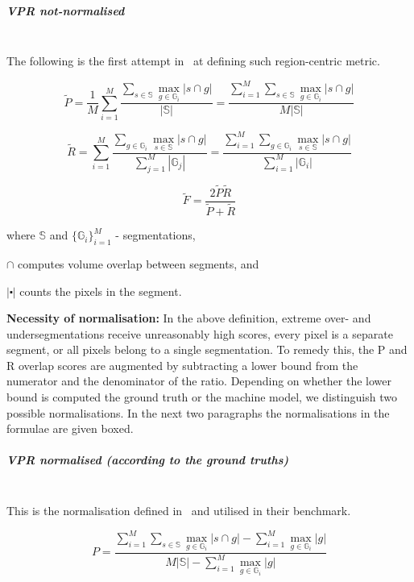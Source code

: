 \subparagraph*{VPR not-normalised}\mbox{}\\
The following is the first attempt in~\cite{Galasso13} at defining such region-centric metric.

\[
\tilde{P}=\frac{1}{M}\sum\limits _{i=1}^{M}\frac{\sum\limits _{s\in\mathbb{S}}\max\limits _{g\in\mathbb{G}_{i}}\left|s\cap g\right|}{\left|\mathbb{S}\right|}=\frac{\sum\limits _{i=1}^{M}\sum\limits _{s\in\mathbb{S}}\max\limits _{g\in\mathbb{G}_{i}}\left|s\cap g\right|}{M\left|\mathbb{S}\right|}
\]

\[
\tilde{R}=\sum\limits _{i=1}^{M}\frac{\sum\limits _{g\in\mathbb{G}_{i}}\max\limits _{s\in\mathbb{S}}\left|s\cap g\right|}{\sum\limits _{j=1}^{M}\left|\mathbb{G}_{j}\right|}=\frac{\sum\limits _{i=1}^{M}\sum\limits _{g\in\mathbb{G}_{i}}\max\limits _{s\in\mathbb{S}}\left|s\cap g\right|}{\sum\limits _{i=1}^{M}\left|\mathbb{G}_{i}\right|}
\]


\[
\tilde{F}=\frac{2\tilde{P}\tilde{R}}{\tilde{P}+\tilde{R}}
\]

where $\mathbb{S}$ and $\{\mathbb{G}_{i}\}_{i=1}^{M}$ - segmentations,

$\cap$ computes volume overlap between segments, and 

$\left|\centerdot\right|$ counts the pixels in the segment.%

\textbf{Necessity of normalisation:} In the above definition, extreme over- and undersegmentations receive unreasonably high scores, \ie every pixel is a separate segment, or all pixels belong to a single segmentation. To remedy this, the P and R overlap scores are augmented by subtracting a lower bound from the numerator and the denominator of the ratio. Depending on whether the lower bound is computed \wrt the ground truth or the machine model, we distinguish two possible normalisations. In the next two paragraphs the normalisations in the formulae are given boxed.

\subparagraph*{VPR normalised (according to the ground truths)}\mbox{}\\ %
This is the normalisation defined in~\cite{Galasso13} and utilised %
in their benchmark.

\[
P=\frac{\sum\limits _{i=1}^{M}\sum\limits _{s\in\mathbb{S}}\max\limits _{g\in\mathbb{G}_{i}}\left|s\cap g\right|-\boxed{\sum\limits _{i=1}^{M}\max\limits _{g\in\mathbb{G}_{i}}\left|g\right|}}{M\left|\mathbb{S}\right|-\boxed{\sum\limits _{i=1}^{M}\max\limits _{g\in\mathbb{G}_{i}}\left|g\right|}}
\]

